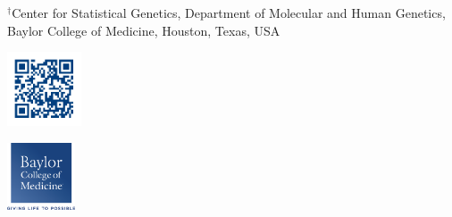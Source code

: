 \documentclass[ansiepaper, portrait, fontscale=0.35]{baposter} %
\begin{document}
\begin{poster}
{\begin{minipage}{24.5cm}
      \vspace{-0.5cm}
      \small
      $^\dagger${Center for Statistical Genetics, Department of Molecular and Human Genetics, Baylor College of Medicine, Houston, Texas, USA} \\
    \end{minipage}
    \begin{minipage}{2cm}
      \vspace{-0.5cm}
      \hspace{0.2cm}
      \includegraphics[height=2.2cm]{qrcode}
    \end{minipage}
    \begin{minipage}{1cm}
      \vspace{-0.2cm}
      \includegraphics[height=2cm]{bcm}
    \end{minipage}
    }


\end{poster}
\end{document}
